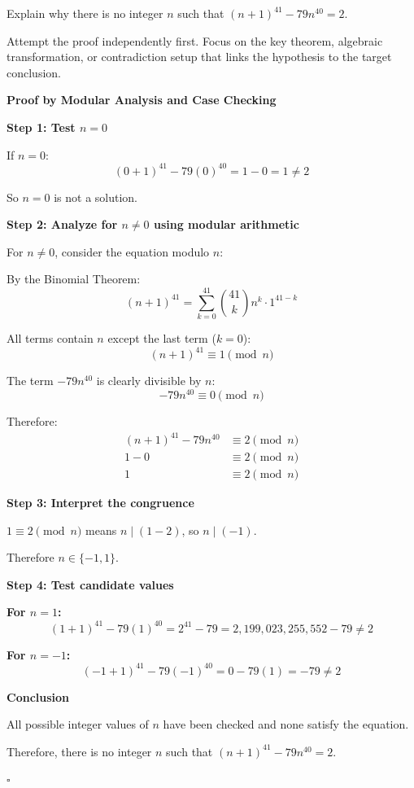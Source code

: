 
\begin{problem}
Explain why there is no integer $n$ such that $(n+1)^{41} - 79n^{40} = 2$.
\end{problem}

\begin{hint}
Attempt the proof independently first. Focus on the key theorem, algebraic transformation, or contradiction setup that links the hypothesis to the target conclusion.
\end{hint}

\begin{solution}
\textbf{Proof by Modular Analysis and Case Checking}

\textbf{Step 1: Test $n = 0$}

If $n = 0$:
\[ (0+1)^{41} - 79(0)^{40} = 1 - 0 = 1 \neq 2 \]

So $n = 0$ is not a solution.

\textbf{Step 2: Analyze for $n \neq 0$ using modular arithmetic}

For $n \neq 0$, consider the equation modulo $n$:

By the Binomial Theorem:
\[ (n+1)^{41} = \sum_{k=0}^{41} \binom{41}{k} n^k \cdot 1^{41-k} \]

All terms contain $n$ except the last term ($k=0$):
\[ (n+1)^{41} \equiv 1 \pmod{n} \]

The term $-79n^{40}$ is clearly divisible by $n$:
\[ -79n^{40} \equiv 0 \pmod{n} \]

Therefore:
\begin{align*}
    (n+1)^{41} - 79n^{40} &\equiv 2 \pmod{n} \\
    1 - 0 &\equiv 2 \pmod{n} \\
    1 &\equiv 2 \pmod{n}
\end{align*}

\textbf{Step 3: Interpret the congruence}

$1 \equiv 2 \pmod{n}$ means $n \mid (1-2)$, so $n \mid (-1)$.

Therefore $n \in \{-1, 1\}$.

\textbf{Step 4: Test candidate values}

\textbf{For $n = 1$:}
\[ (1+1)^{41} - 79(1)^{40} = 2^{41} - 79 = 2,199,023,255,552 - 79 \neq 2 \]

\textbf{For $n = -1$:}
\[ (-1+1)^{41} - 79(-1)^{40} = 0 - 79(1) = -79 \neq 2 \]

\textbf{Conclusion}

All possible integer values of $n$ have been checked and none satisfy the equation.

Therefore, there is no integer $n$ such that $(n+1)^{41} - 79n^{40} = 2$.

\hfill $\square$
\end{solution}

